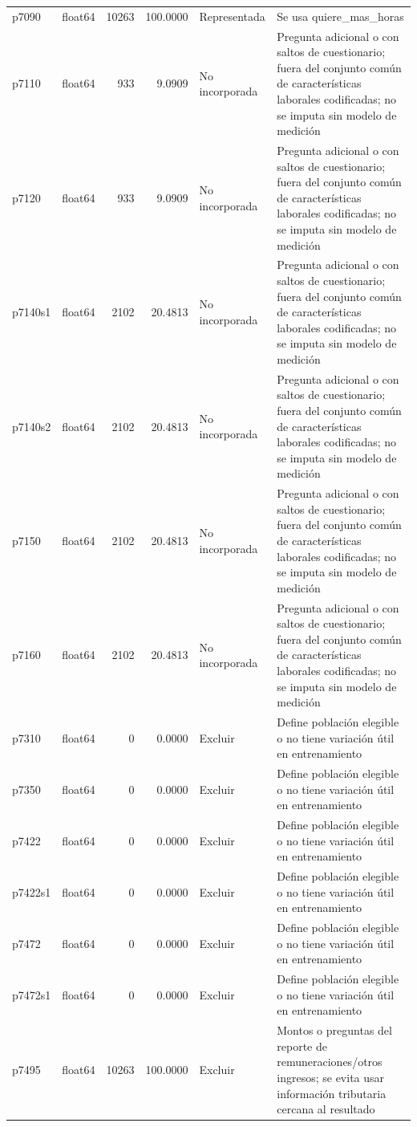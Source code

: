 \begin{longtable}{llrrll}
p7090 & float64 & 10263 & 100.0000 & Representada & Se usa quiere\_mas\_horas \\
p7110 & float64 & 933 & 9.0909 & No incorporada & Pregunta adicional o con saltos de cuestionario; fuera del conjunto común de características laborales codificadas; no se imputa sin modelo de medición \\
p7120 & float64 & 933 & 9.0909 & No incorporada & Pregunta adicional o con saltos de cuestionario; fuera del conjunto común de características laborales codificadas; no se imputa sin modelo de medición \\
p7140s1 & float64 & 2102 & 20.4813 & No incorporada & Pregunta adicional o con saltos de cuestionario; fuera del conjunto común de características laborales codificadas; no se imputa sin modelo de medición \\
p7140s2 & float64 & 2102 & 20.4813 & No incorporada & Pregunta adicional o con saltos de cuestionario; fuera del conjunto común de características laborales codificadas; no se imputa sin modelo de medición \\
p7150 & float64 & 2102 & 20.4813 & No incorporada & Pregunta adicional o con saltos de cuestionario; fuera del conjunto común de características laborales codificadas; no se imputa sin modelo de medición \\
p7160 & float64 & 2102 & 20.4813 & No incorporada & Pregunta adicional o con saltos de cuestionario; fuera del conjunto común de características laborales codificadas; no se imputa sin modelo de medición \\
p7310 & float64 & 0 & 0.0000 & Excluir & Define población elegible o no tiene variación útil en entrenamiento \\
p7350 & float64 & 0 & 0.0000 & Excluir & Define población elegible o no tiene variación útil en entrenamiento \\
p7422 & float64 & 0 & 0.0000 & Excluir & Define población elegible o no tiene variación útil en entrenamiento \\
p7422s1 & float64 & 0 & 0.0000 & Excluir & Define población elegible o no tiene variación útil en entrenamiento \\
p7472 & float64 & 0 & 0.0000 & Excluir & Define población elegible o no tiene variación útil en entrenamiento \\
p7472s1 & float64 & 0 & 0.0000 & Excluir & Define población elegible o no tiene variación útil en entrenamiento \\
p7495 & float64 & 10263 & 100.0000 & Excluir & Montos o preguntas del reporte de remuneraciones/otros ingresos; se evita usar información tributaria cercana al resultado \\

\end{longtable}
